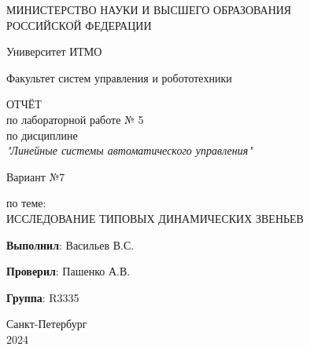 \thispagestyle{empty}

\begin{center}
    МИНИСТЕРСТВО НАУКИ И ВЫСШЕГО ОБРАЗОВАНИЯ \\ РОССИЙСКОЙ ФЕДЕРАЦИИ

    \vspace{20pt}

    Университет ИТМО

    \vspace{20pt}

    Факультет систем управления и робототехники
\end{center}

\vfill

\begin{center}
    ОТЧЁТ \\  
    по лабораторной работе № 5\\
    по дисциплине \\
    \textit{"Линейные системы автоматического управления"}

    
    \vspace{20pt}
    
    Вариант №7

    \vspace{20pt}

    по теме: \\
    \uppercase{Исследование типовых динамических звеньев}
\end{center}

\vfill
\hfil

    \noindent \hfill \textbf{Выполнил}: Васильев В.С.

    \vspace{20pt}

    \noindent \hfill \textbf{Проверил}: Пашенко А.В.

    \vspace{20pt}

    \noindent \hfill \textbf{Группа}: R3335

\vfill
\hfil

\begin{center}
    Санкт-Петербург \\ 2024
\end{center}